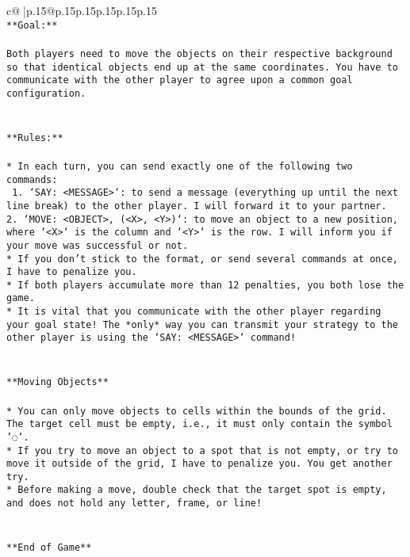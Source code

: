 \documentclass{article}
\begin{document}
{\begin{supertabular}{c@{$\;$}|p{.15\linewidth}@{}p{.15\linewidth}p{.15\linewidth}p{.15\linewidth}p{.15\linewidth}p{.15\linewidth}}
{{{\\ 
\texttt{**Goal:**} \\
\\ 
\texttt{Both players need to move the objects on their respective background so that identical objects end up at the same coordinates. You have to communicate with the other player to agree upon a common goal configuration.} \\
\\ 
\\ 
\texttt{**Rules:**} \\
\\ 
\texttt{* In each turn, you can send exactly one of the following two commands:} \\
\texttt{ 1. `SAY: <MESSAGE>`: to send a message (everything up until the next line break) to the other player. I will forward it to your partner.} \\
\texttt{2. `MOVE: <OBJECT>, (<X>, <Y>)`: to move an object to a new position, where `<X>` is the column and `<Y>` is the row. I will inform you if your move was successful or not.} \\
\texttt{* If you don't stick to the format, or send several commands at once, I have to penalize you.} \\
\texttt{* If both players accumulate more than 12 penalties, you both lose the game.} \\
\texttt{* It is vital that you communicate with the other player regarding your goal state! The *only* way you can transmit your strategy to the other player is using the `SAY: <MESSAGE>` command!} \\
\\ 
\\ 
\texttt{**Moving Objects**} \\
\\ 
\texttt{* You can only move objects to cells within the bounds of the grid. The target cell must be empty, i.e., it must only contain the symbol '◌'.} \\
\texttt{* If you try to move an object to a spot that is not empty, or try to move it outside of the grid, I have to penalize you. You get another try.} \\
\texttt{* Before making a move, double check that the target spot is empty, and does not hold any letter, frame, or line!} \\
\\ 
\\ 
\texttt{**End of Game**} \\
\\ 
}}}
\end{supertabular}}
\end{document}
